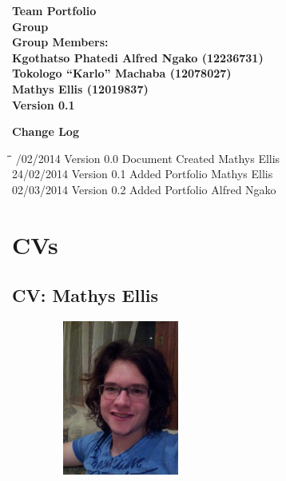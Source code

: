 \documentclass[12pt]{article}
\newcommand{\Title}{Team Portfolio} %
\begin{document}
	\begin{center}%
	
	  \LARGE \bf \Title \\[4em]
	  \LARGE {\bf Group }\\[1em]
	  \LARGE {\bf Group Members:}\\[2em]
	  \large
	      Kgothatso Phatedi Alfred Ngako	(12236731) \\[1em]
	   	  Tokologo “Karlo” Machaba			(12078027) \\[1em]
	   	  Mathys Ellis						(12019837) \\[8em]
	   	  {\bf Version 0.1}	    
	\end{center}%
	
	\newpage
	{\LARGE \bf Change Log}\\[2em]	
		\begin{tabbing}
			\hspace*{3cm}\=\hspace*{3cm}\=\hspace*{8cm}\=\hspace*{3cm} /02/2014 \> Version 0.0 \> Document Created \> Mathys Ellis\\ 
			24/02/2014 \> Version 0.1 \> Added Portfolio \> Mathys Ellis\\
			02/03/2014 \> Version 0.2 \> Added Portfolio \> Alfred Ngako\\
		\end{tabbing}
			
	\newpage
		\tableofcontents
			
	\newpage
	\section{CVs}
	
	\newpage
	\subsection{CV: Mathys Ellis}
	
	\begin{figure}[ht!]
		\centering
		\includegraphics[width=2in, height=2in]{./Pictures/MathysEllis.jpg}
	\end{figure}
		
\end{document}
